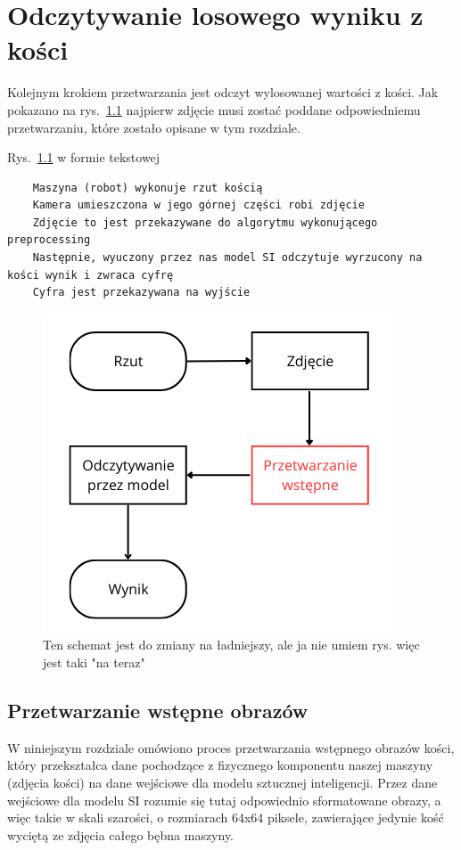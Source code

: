\chapter{Odczytywanie losowego wyniku z kości}\label{ch:odczytywanie-losowego-wyniku-z-kosci}

Kolejnym krokiem przetwarzania jest odczyt wylosowanej wartości z kości.
Jak pokazano na rys.~\ref{fig:schemat_workflow}
najpierw zdjęcie musi zostać poddane odpowiedniemu przetwarzaniu, które zostało opisane w tym rozdziale.

Rys.~\ref{fig:schemat_workflow} w formie tekstowej
\begin{verbatim}
    Maszyna (robot) wykonuje rzut kością
    Kamera umieszczona w jego górnej części robi zdjęcie
    Zdjęcie to jest przekazywane do algorytmu wykonującego preprocessing
    Następnie, wyuczony przez nas model SI odczytuje wyrzucony na kości wynik i zwraca cyfrę
    Cyfra jest przekazywana na wyjście
\end{verbatim}

\begin{figure}[H]
    \centering
    \includegraphics[width=0.5\linewidth]{chapters/04-czytanie/figures/schemat}
    \caption{Ten schemat jest do zmiany na ładniejszy, ale ja nie umiem rys. więc jest taki "na teraz"}
    \label{fig:schemat_workflow}
\end{figure}

\section{Przetwarzanie wstępne obrazów}\label{sec:preprocessing}

W niniejszym rozdziale omówiono proces przetwarzania wstępnego obrazów kości,
który przekształca dane pochodzące z fizycznego komponentu naszej maszyny (zdjęcia kości) na dane wejściowe dla modelu sztucznej inteligencji.
Przez dane wejściowe dla modelu SI rozumie się tutaj odpowiednio sformatowane obrazy, a więc takie w skali szarości,
o rozmiarach 64x64 piksele, zawierające jedynie kość wyciętą ze zdjęcia całego bębna maszyny.

